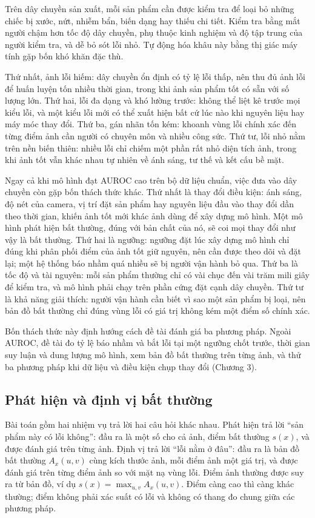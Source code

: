 Trên dây chuyền sản xuất, mỗi sản phẩm cần được kiểm tra để loại bỏ những chiếc bị xước, nứt, nhiễm bẩn, biến dạng
hay thiếu chi tiết. Kiểm tra bằng mắt người chậm hơn tốc độ dây chuyền, phụ thuộc kinh nghiệm và độ tập trung của
người kiểm tra, và dễ bỏ sót lỗi nhỏ. Tự động hóa khâu này bằng thị giác máy tính gặp bốn khó khăn đặc thù.

Thứ nhất, ảnh lỗi hiếm: dây chuyền ổn định có tỷ lệ lỗi thấp, nên thu đủ ảnh lỗi để huấn luyện tốn nhiều thời gian,
trong khi ảnh sản phẩm tốt có sẵn với số lượng lớn. Thứ hai, lỗi đa dạng và khó lường trước: không thể liệt kê trước
mọi kiểu lỗi, và một kiểu lỗi mới có thể xuất hiện bất cứ lúc nào khi nguyên liệu hay máy móc thay đổi. Thứ ba, gán
nhãn tốn kém: khoanh vùng lỗi chính xác đến từng điểm ảnh cần người có chuyên môn và nhiều công sức. Thứ tư, lỗi nhỏ
nằm trên nền biến thiên: nhiều lỗi chỉ chiếm một phần rất nhỏ diện tích ảnh, trong khi ảnh tốt vẫn khác nhau tự
nhiên về ánh sáng, tư thế và kết cấu bề mặt.

Ngay cả khi mô hình đạt AUROC cao trên bộ dữ liệu chuẩn, việc đưa vào dây chuyền còn gặp bốn thách thức
khác. Thứ nhất là thay đổi điều kiện: ánh sáng, độ nét của camera, vị trí đặt sản phẩm hay nguyên
liệu đầu vào thay đổi dần theo thời gian, khiến ảnh tốt mới khác ảnh dùng để xây dựng mô hình. Một mô hình phát hiện
bất thường, đúng với bản chất của nó, sẽ coi mọi thay đổi như vậy là bất thường. Thứ hai là ngưỡng: ngưỡng đặt lúc
xây dựng mô hình chỉ đúng khi phân phối điểm của ảnh tốt giữ nguyên, nên cần được theo dõi và đặt lại; một hệ thống
báo nhầm quá nhiều sẽ bị người vận hành bỏ qua. Thứ ba là tốc độ và tài nguyên: mỗi sản phẩm thường chỉ có vài chục
đến vài trăm mili giây để kiểm tra, và mô hình phải chạy trên phần cứng đặt cạnh dây chuyền. Thứ tư là khả năng giải
thích: người vận hành cần biết vì sao một sản phẩm bị loại, nên bản đồ bất thường chỉ đúng vùng lỗi có giá trị không
kém một điểm số chính xác.

Bốn thách thức này định hướng cách đề tài đánh giá ba phương pháp. Ngoài AUROC, đề tài đo tỷ lệ báo nhầm và bắt lỗi
tại một ngưỡng chốt trước, thời gian suy luận và dung lượng mô hình, xem bản đồ bất thường trên từng ảnh, và thử ba
phương pháp khi dữ liệu và điều kiện chụp thay đổi (Chương 3).

\subsection{Phát hiện và định vị bất thường}

Bài toán gồm hai nhiệm vụ trả lời hai câu hỏi khác nhau. Phát hiện trả lời ``sản phẩm này có lỗi không'': đầu ra là
một số cho cả ảnh, điểm bất thường $s(x)$, và được đánh giá trên từng ảnh. Định vị trả lời ``lỗi nằm ở đâu'': đầu ra
là bản đồ bất thường $A_x(u,v)$ cùng kích thước ảnh, mỗi điểm ảnh một giá trị, và được đánh giá trên từng điểm ảnh so
với mặt nạ vùng lỗi. Điểm ảnh thường được suy ra từ bản đồ, ví dụ $s(x) = \max_{u,v} A_x(u,v)$. Điểm càng cao thì
càng khác thường; điểm không phải xác suất có lỗi và không có thang đo chung giữa các phương pháp.

